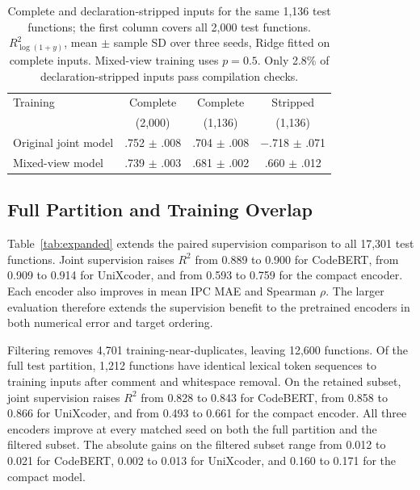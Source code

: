 \documentclass[conference]{IEEEtran}
\newcommand{\new}[1]{{#1}}
\newenvironment{newtext}{\begingroup}{\endgroup}
\newcommand{\Rsq}{R^{2}}
\begin{document}
\begin{table}[t]
\begin{newtext}
\caption{\new{Complete and declaration-stripped inputs for the same 1,136 test functions; the first column covers all 2,000 test functions. $\Rsq_{\log(1+y)}$, mean $\pm$ sample SD over three seeds, Ridge fitted on complete inputs. Mixed-view training uses $p=0.5$. Only 2.8\% of declaration-stripped inputs pass compilation checks.}}
\label{tab:incomplete}
\centering\small
\setlength{\tabcolsep}{3pt}
\begin{tabular}{lccc}
\toprule
Training & Complete & Complete & Stripped\\
 & (2,000) & (1,136) & (1,136)\\
\midrule
Original joint model & .752 $\pm$ .008 & .704 $\pm$ .008 & $-$.718 $\pm$ .071\\
Mixed-view model & .739 $\pm$ .003 & .681 $\pm$ .002 & .660 $\pm$ .012\\
\bottomrule
\end{tabular}
\end{newtext}
\end{table}



\subsection{Full Partition and Training Overlap}
\label{sec:expanded}
Table~\ref{tab:expanded} extends the paired supervision comparison to all 17,301 test functions. Joint supervision raises $\Rsq$ from 0.889 to 0.900 for CodeBERT, from 0.909 to 0.914 for UniXcoder, and from 0.593 to 0.759 for the compact encoder. Each encoder also improves in mean IPC MAE and Spearman $\rho$. The larger evaluation therefore extends the supervision benefit to the pretrained encoders in both numerical error and target ordering.

Filtering removes 4,701 training-near-duplicates, leaving 12,600 functions. Of the full test partition, 1,212 functions have identical lexical token sequences to training inputs after comment and whitespace removal. On the retained subset, joint supervision raises $\Rsq$ from 0.828 to 0.843 for CodeBERT, from 0.858 to 0.866 for UniXcoder, and from 0.493 to 0.661 for the compact encoder. All three encoders improve at every matched seed on both the full partition and the filtered subset. The absolute gains on the filtered subset range from 0.012 to 0.021 for CodeBERT, 0.002 to 0.013 for UniXcoder, and 0.160 to 0.171 for the compact model.
\end{document}

